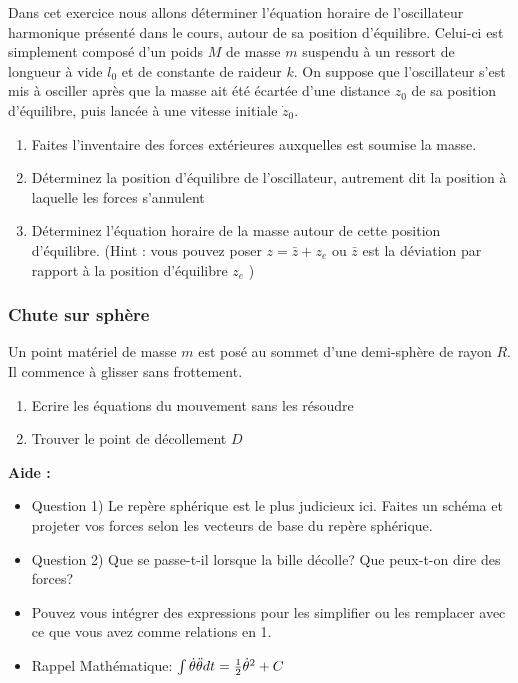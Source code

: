 \documentclass[a4paper,10pt,twoside]{article}
\begin{document}
Dans cet exercice nous allons déterminer l'équation horaire de l'oscillateur harmonique présenté dans le cours, autour de sa position d'équilibre. Celui-ci est simplement composé d'un poids $M$ de masse $m$ suspendu à un ressort de longueur à vide $l_0$ et de constante de raideur $k$. On suppose que l'oscillateur s'est mis à osciller après que la masse ait été écartée d'une distance $z_0$ de sa position d'équilibre, puis lancée à une vitesse initiale $\dot z_0$.
\begin{enumerate}
    \item Faites l'inventaire des forces extérieures auxquelles est soumise la masse.
    \item Déterminez la position d'équilibre de l'oscillateur, autrement dit la position à laquelle les forces s'annulent
    \item Déterminez l'équation horaire de la masse autour de cette position d'équilibre. (Hint : vous pouvez poser $z = \bar z + z_e$ ou $\bar z$ est la déviation par rapport à la position d'équilibre $z_e$ )
\end{enumerate}

\subsubsection{Chute sur sphère}
Un point matériel de masse $m$ est posé au sommet d'une demi-sphère de rayon $R$. Il commence à glisser sans frottement.
\begin{enumerate}
    \item Ecrire les équations du mouvement sans les résoudre
    \item Trouver le point de décollement $D$
\end{enumerate}

 \par\leavevmode\par
 \textbf{Aide :} 
 \begin{itemize}
     
 \item Question 1)  Le repère sphérique est le plus judicieux ici. Faites un schéma et projeter vos forces selon les vecteurs de base du repère sphérique.
 
 \item Question 2) Que se passe-t-il lorsque la bille décolle? Que peux-t-on dire des forces? 
 \item Pouvez vous intégrer des expressions pour les simplifier ou les remplacer avec ce que vous avez comme relations en 1. 
 \item Rappel Mathématique: $\int \dot \theta \Ddot{\theta} dt = \frac{1}{2} \Dot{\theta}^2 + C$
 \end{itemize}
 
\end{document}
